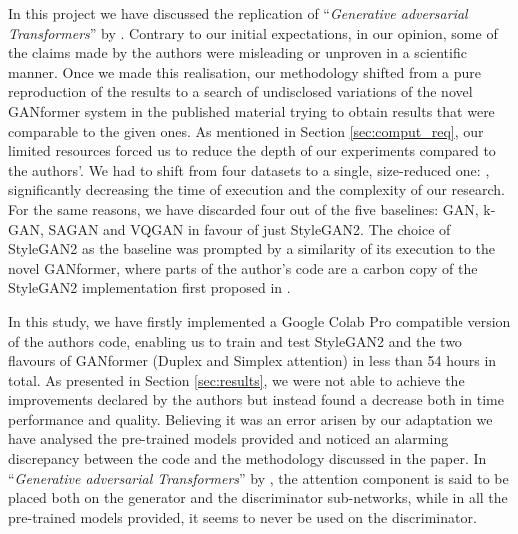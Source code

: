 \documentclass{article}
\begin{document}
	In this project we have discussed the replication of ``\emph{Generative adversarial Transformers}'' 
	by 
	\citet{hudson2021generative}.
	Contrary to our initial expectations, in our opinion, some of the claims made by the authors were 
	misleading or unproven in a scientific manner.
	Once we made this realisation, our methodology shifted from a pure reproduction of the results to a 
	search of undisclosed variations of the novel GANformer system in the published material trying to 
	obtain 
	results that were comparable to the given ones.
	As mentioned in Section \ref{sec:comput_req}, our limited resources forced us to reduce the depth 
	of our experiments 
	compared to the authors'.
	We had to shift from four datasets to a single, size-reduced one: \citet{cartoonset}, significantly 
	decreasing the time of execution and the complexity of our research.
	For the same reasons, we have discarded four out of the five baselines: GAN, k-GAN, SAGAN and 
	VQGAN 
	in favour of just StyleGAN2.
	The choice of StyleGAN2 as the baseline was prompted by a similarity of its execution to the novel 
	GANformer, where parts of the author's code are a carbon copy of the StyleGAN2 implementation 
	first 
	proposed in \citet{karras2019style}.
	
	In this study, we have firstly implemented a Google Colab Pro compatible version of the authors 
	code, 
	enabling us to train and test StyleGAN2 and the two flavours of GANformer (Duplex and Simplex 
	attention) 
	in less than 54 hours in total.
	As presented in Section \ref{sec:results}, we were not able to achieve the improvements declared by 
	the authors but instead 
	found a decrease both in time performance and quality.
	Believing it was an error arisen by our adaptation we have analysed the pre-trained models provided 
	and 
	noticed an alarming discrepancy between the code and the methodology discussed in the paper.
	In ``\emph{Generative adversarial Transformers}'' by \citet{hudson2021generative}, the attention 
	component 
	is said to be placed both on the generator and the discriminator sub-networks, while in all the 
	pre-trained 
	models provided, it seems to never be used on the discriminator.
	
\end{document}
